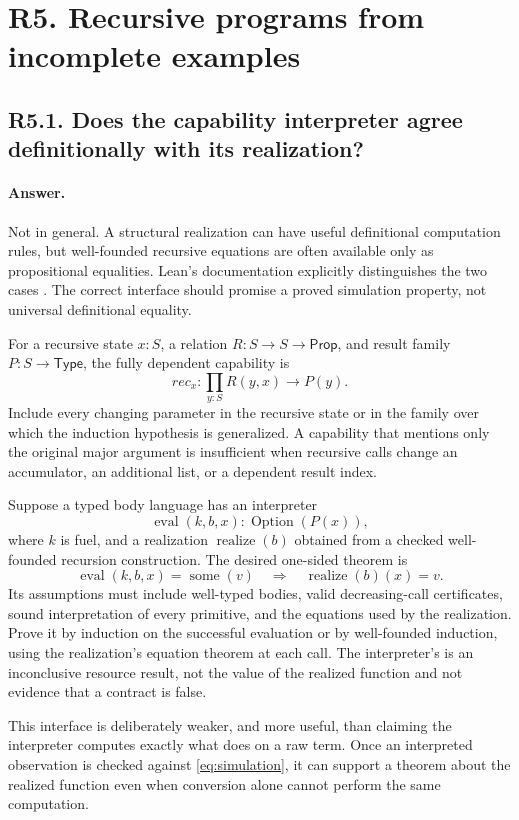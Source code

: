 \documentclass[11pt,a4paper]{article}
\newcommand{\code}[1]{\texttt{\detokenize{#1}}}
\newcommand{\type}{\ensuremath{\mathsf{Type}}}
\newcommand{\Prop}{\ensuremath{\mathsf{Prop}}}
\newcommand{\answer}{\paragraph{Answer.}}
\theoremstyle{definition}
\theoremstyle{remark}
\begin{document}
\section{R5. Recursive programs from incomplete examples}
\label{sec:r5}

\subsection{R5.1. Does the capability interpreter agree definitionally with its realization?}
\answer Not in general. A structural realization can have useful definitional
computation rules, but well-founded recursive equations are often available only
as propositional equalities. Lean's documentation explicitly distinguishes the
two cases \cite{leanrec}. The correct interface should promise a proved
simulation property, not universal definitional equality.

For a recursive state $x:S$, a relation $R:S\to S\to\Prop$, and result family
$P:S\to\type$, the fully dependent capability is
\[
 \mathit{rec}_x : \prod_{y:S} R(y,x)\to P(y).
\]
Include every changing parameter in the recursive state or in the family over
which the induction hypothesis is generalized. A capability that mentions only
the original major argument is insufficient when recursive calls change an
accumulator, an additional list, or a dependent result index.

Suppose a typed body language has an interpreter
\[
 \operatorname{eval}(k,b,x):\operatorname{Option}(P(x)),
\]
where $k$ is fuel, and a realization $\operatorname{realize}(b)$ obtained from a
checked well-founded recursion construction. The desired one-sided theorem is
\begin{equation}
 \operatorname{eval}(k,b,x)=\operatorname{some}(v)
 \quad\Longrightarrow\quad
 \operatorname{realize}(b)(x)=v.
 \label{eq:simulation}
\end{equation}
Its assumptions must include well-typed bodies, valid decreasing-call
certificates, sound interpretation of every primitive, and the equations used
by the realization. Prove it by induction on the successful evaluation or by
well-founded induction, using the realization's equation theorem at each call.
The interpreter's \code{none} is an inconclusive resource result, not the value
of the realized function and not evidence that a contract is false.

This interface is deliberately weaker, and more useful, than claiming the
interpreter computes exactly what \code{Kernel.whnf} does on a raw
\code{WellFounded.fix} term. Once an interpreted observation is checked against
\eqref{eq:simulation}, it can support a theorem about the realized function even
when conversion alone cannot perform the same computation.
\end{document}
